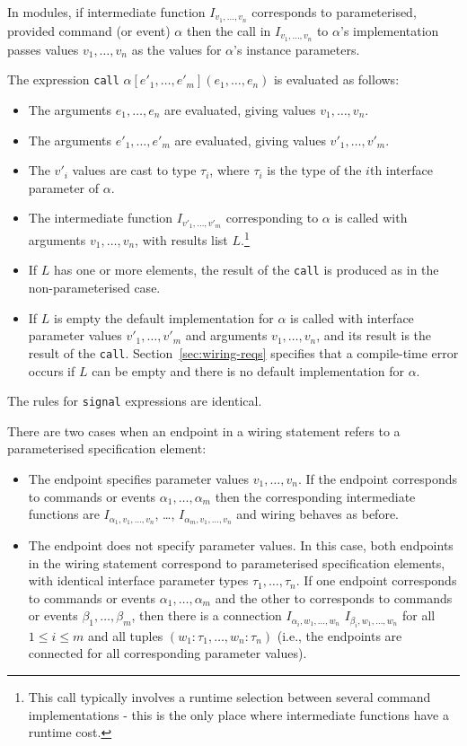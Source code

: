 \documentclass[11pt,letterpaper]{article}
\newcommand{\code}[1]{{\tt #1}}
\begin{document}
In modules, if intermediate function $I_{v_1, \ldots, v_n}$ corresponds
to parameterised, provided command (or event) $\alpha$ then the call in
$I_{v_1, \ldots, v_n}$ to $\alpha$'s implementation passes values $v_1,
\ldots, v_n$ as the values for $\alpha$'s instance parameters. 

The expression \code{call} $\alpha[e'_1, \ldots, e'_m](e_1, \ldots, e_n)$
is evaluated as follows:
\begin{itemize}
\item The arguments $e_1, \ldots, e_n$ are evaluated, giving values $v_1,
\ldots, v_n$.
\item The arguments $e'_1, \ldots, e'_m$ are evaluated, giving values $v'_1,
\ldots, v'_m$.
\item The $v'_i$ values are cast to type $\tau_i$, where $\tau_i$ is the
type of the $i$th interface parameter of $\alpha$.
\item The intermediate function $I_{v'_1,\ldots,v'_m}$ corresponding to
$\alpha$ is called with arguments $v_1, \ldots, v_n$, with results list
$L$.\footnote{This call typically involves a runtime selection between
several command implementations - this is the only place where intermediate
functions have a runtime cost.}
\item If $L$ has one or more elements, the result of the \code{call} is
produced as in the non-parameterised case.
\item If $L$ is empty the default implementation for $\alpha$ is called
with interface parameter values $v'_1, \ldots, v'_m$ and arguments $v_1,
\ldots, v_n$, and its result is the result of the
\code{call}. Section~\ref{sec:wiring-reqs} specifies that a compile-time
error occurs if $L$ can be empty and there is no default implementation for
$\alpha$.
\end{itemize}
The rules for \code{signal} expressions are identical.

There are two cases when an endpoint in a wiring statement refers to a
parameterised specification element:
\begin{itemize}
\item The endpoint specifies parameter values $v_1, \ldots, v_n$. If the
endpoint corresponds to commands or events $\alpha_1, \ldots, \alpha_m$
then the corresponding intermediate functions are
$I_{\alpha_1,v_1,\ldots,v_n}$, \ldots, $I_{\alpha_m,v_1,\ldots,v_n}$ and
wiring behaves as before.
\item The endpoint does not specify parameter values. In this case, both
endpoints in the wiring statement correspond to parameterised specification
elements, with identical interface parameter types $\tau_1, \ldots,
\tau_n$. If one endpoint corresponds to commands or events $\alpha_1,
\ldots, \alpha_m$ and the other to corresponds to commands or events
$\beta_1, \ldots, \beta_m$, then there is a connection $I_{\alpha_i, w_1,
\ldots, w_n}$ \code{<->} $I_{\beta_i, w_1,\ldots, w_n}$ for all $1 \leq i
\leq m$ and all tuples $(w_1:\tau_1, \ldots, w_n:\tau_n)$ (i.e., the
endpoints are connected for all corresponding parameter values).
\end{itemize}
\end{document}
